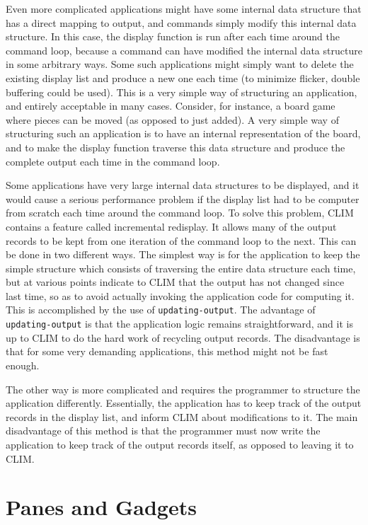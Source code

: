 Even more complicated applications might have some internal data
structure that has a direct mapping to output, and commands simply
modify this internal data structure.  In this case, the display
function is run after each time around the command loop, because a
command can have modified the internal data structure in some
arbitrary ways.  Some such applications might simply want to delete
the existing display list and produce a new one each time (to minimize
flicker, double buffering could be used).  This is a very simple way
of structuring an application, and entirely acceptable in many cases.
Consider, for instance, a board game where pieces can be moved (as
opposed to just added).  A very simple way of structuring such an
application is to have an internal representation of the board, and to
make the display function traverse this data structure and produce the
complete output each time in the command loop.  

Some applications have very large internal data structures to be
displayed, and it would cause a serious performance problem if the
display list had to be computer from scratch each time around the
command loop.  To solve this problem, CLIM contains a feature called
incremental redisplay.  It allows many of the output records to be
kept from one iteration of the command loop to the next.  This can be
done in two different ways.  The simplest way is for the application
to keep the simple structure which consists of traversing the entire
data structure each time, but at various points indicate to CLIM that
the output has not changed since last time, so as to avoid actually
invoking the application code for computing it.  This is accomplished
by the use of \texttt{updating-output}.  The advantage of
\texttt{updating-output} is that the application logic remains
straightforward, and it is up to CLIM to do the hard work of recycling
output records.  The disadvantage is that for some very demanding
applications, this method might not be fast enough.

The other way is more complicated and requires the programmer to
structure the application differently.  Essentially, the application
has to keep track of the output records in the display list, and
inform CLIM about modifications to it.  The main disadvantage of this
method is that the programmer must now write the application to keep
track of the output records itself, as opposed to leaving it to CLIM. 

\section{Panes and Gadgets}


